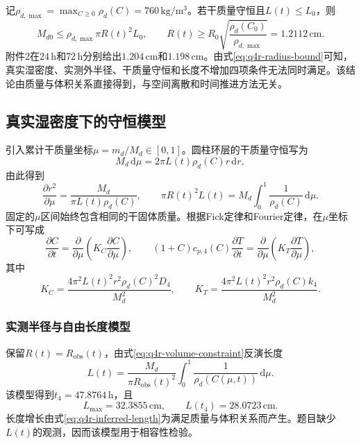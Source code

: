 记$\rho_{d,\max}=\max_{C\ge0}\rho_d(C)=760\,\mathrm{kg/m^3}$。若干质量守恒且$L(t)\le L_0$，则
\begin{equation}
M_{d0}\le \rho_{d,\max}\pi R(t)^2L_0,
\qquad
R(t)\ge
R_0\sqrt{\frac{\rho_d(C_0)}{\rho_{d,\max}}}
=1.2112\,\mathrm{cm}.
\label{eq:q4r-radius-bound}
\end{equation}
附件2在$24\,\mathrm h$和$72\,\mathrm h$分别给出$1.204\,\mathrm{cm}$和$1.198\,\mathrm{cm}$。由式\eqref{eq:q4r-radius-bound}可知，真实湿密度、实测外半径、干质量守恒和长度不增加四项条件无法同时满足。该结论由质量与体积关系直接得到，与空间离散和时间推进方法无关。

\subsection{真实湿密度下的守恒模型}

引入累计干质量坐标$\mu=m_d/M_d\in[0,1]$。圆柱环层的干质量守恒写为
\begin{equation}
M_d\,\mathrm d\mu
=2\pi L(t)\rho_d(C)r\,\mathrm dr,
\label{eq:q4r-mass-coordinate}
\end{equation}
由此得到
\begin{equation}
\frac{\partial r^2}{\partial\mu}
=\frac{M_d}{\pi L(t)\rho_d(C)},
\qquad
\pi R(t)^2L(t)
=M_d\int_0^1\frac{1}{\rho_d(C)}\,\mathrm d\mu.
\label{eq:q4r-volume-constraint}
\end{equation}
固定的$\mu$区间始终包含相同的干固体质量。根据Fick定律和Fourier定律\cite{fick1855,crank1975,bird2002}，在$\mu$坐标下可写成
\begin{equation}
\frac{\partial C}{\partial t}
=\frac{\partial}{\partial\mu}
\left(K_C\frac{\partial C}{\partial\mu}\right),
\qquad
(1+C)c_{p,4}(C)\frac{\partial T}{\partial t}
=\frac{\partial}{\partial\mu}
\left(K_T\frac{\partial T}{\partial\mu}\right),
\label{eq:q4r-mass-pde}
\end{equation}
其中
\begin{equation}
K_C=\frac{4\pi^2L(t)^2r^2\rho_d(C)^2D_4}{M_d^2},
\qquad
K_T=\frac{4\pi^2L(t)^2r^2\rho_d(C)k_4}{M_d^2}.
\label{eq:q4r-mass-coefficients}
\end{equation}

\subsubsection{实测半径与自由长度模型}

保留$R(t)=R_{\mathrm{obs}}(t)$，由式\eqref{eq:q4r-volume-constraint}反演长度
\begin{equation}
L(t)=\frac{M_d}{\pi R_{\mathrm{obs}}(t)^2}
\int_0^1\frac{1}{\rho_d(C(\mu,t))}\,\mathrm d\mu.
\label{eq:q4r-inferred-length}
\end{equation}
该模型得到$t_4=47.8764\,\mathrm h$，且
\begin{equation}
L_{\max}=32.3855\,\mathrm{cm},
\qquad L(t_4)=28.0723\,\mathrm{cm}.
\label{eq:q4r-length-result}
\end{equation}
长度增长由式\eqref{eq:q4r-inferred-length}为满足质量与体积关系而产生。题目缺少$L(t)$的观测，因而该模型用于相容性检验。

